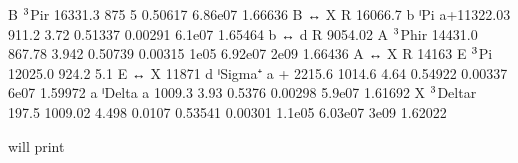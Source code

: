\documentclass[letterpaper,10pt,english]{sphinxmanual}
\begin{document}
\begin{sphinxVerbatim}[commandchars=\\\{\}]
B \(\sp{\text{3}}\)Pi\PYGZus{}r     16331.3         875            5                    0.50617                        6.86e\PYGZhy{}07            1.66636  B ↔ X R   16066.7
b ⁱPi       a+11322.0\PYGZus{}3     911.2          3.72                 0.51337    0.00291             6.1e\PYGZhy{}07             1.65464  b ↔ d R    9054.02
A \(\sp{\text{3}}\)Phi\PYGZus{}r    14431.0         867.78         3.942                0.50739    0.00315   \PYGZhy{}1e\PYGZhy{}05    6.92e\PYGZhy{}07     2e\PYGZhy{}09  1.66436  A ↔ X R   14163
E \(\sp{\text{3}}\)Pi       12025.0         924.2          5.1                                                                              E ↔ X     11871
d ⁱSigma⁺   a + 2215.6     1014.6          4.64                 0.54922    0.00337             6e\PYGZhy{}07               1.59972
a ⁱDelta    a              1009.3          3.93                 0.5376     0.00298             5.9e\PYGZhy{}07             1.61692
X \(\sp{\text{3}}\)Delta\PYGZus{}r  197.5          1009.02         4.498       \PYGZhy{}0.0107  0.53541    0.00301   \PYGZhy{}1.1e\PYGZhy{}05  6.03e\PYGZhy{}07     3e\PYGZhy{}09  1.62022
\end{sphinxVerbatim}

\begin{sphinxVerbatim}[commandchars=\\\{\}]
 
\end{sphinxVerbatim}

will print
\end{document}
